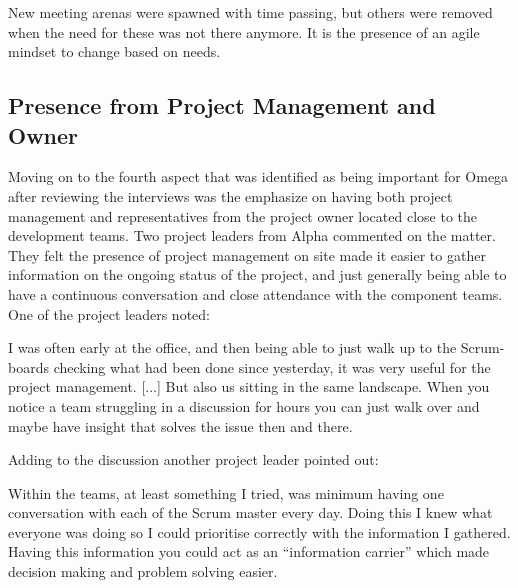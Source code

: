 \begin{fancyquotes}
New meeting arenas were spawned with time passing, but others were removed when the need for these was not there anymore. It is the presence of an agile mindset to change based on needs.
\end{fancyquotes}


\subsection{Presence from Project Management and Owner}

Moving on to the fourth aspect that was identified as being important for Omega after reviewing the interviews was the emphasize on having both project management and representatives from the project owner located close to the development teams. Two project leaders from Alpha commented on the matter. They felt the presence of project management on site made it easier to gather information on the ongoing status of the project, and just generally being able to have a continuous conversation and close attendance with the component teams. One of the project leaders noted:

\begin{fancyquotes}
I was often early at the office, and then being able to just walk up to the Scrum-boards checking what had been done since yesterday, it was very useful for the project management. [...] But also us sitting in the same landscape. When you notice a team struggling in a discussion for hours you can just walk over and maybe have insight that solves the issue then and there.
\end{fancyquotes}

Adding to the discussion another project leader pointed out:

\begin{fancyquotes}
Within the teams, at least something I tried, was minimum having one conversation with each of the Scrum master every day. Doing this I knew what everyone was doing so I could prioritise correctly with the information I gathered. Having this information you could act as an ``information carrier'' which made decision making and problem solving easier.
\end{fancyquotes}

